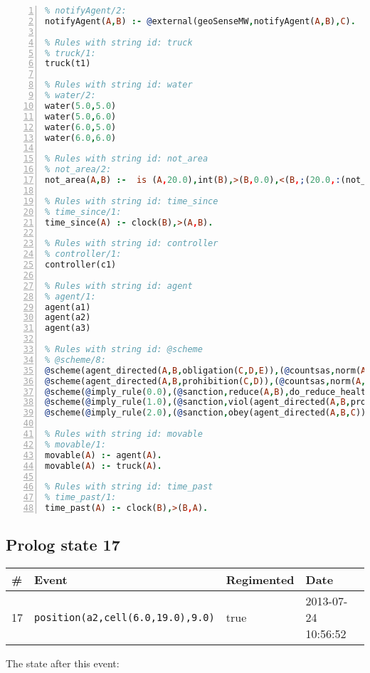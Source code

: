 \documentclass[11pt]{article}\usepackage[utf8]{inputenc}\usepackage{geometry}
\begin{document}
\begin{lstlisting}[language=Prolog, numbers=left]
% Rules with string id: notifyAgent
% notifyAgent/2:
notifyAgent(A,B) :- @external(geoSenseMW,notifyAgent(A,B),C).

% Rules with string id: truck
% truck/1:
truck(t1)

% Rules with string id: water
% water/2:
water(5.0,5.0)
water(5.0,6.0)
water(6.0,5.0)
water(6.0,6.0)

% Rules with string id: not_area
% not_area/2:
not_area(A,B) :-  is (A,20.0),int(B),>(B,0.0),<(B,;(20.0,:(not_area(A,B), is (-(B),20.0)))),int(A),>(A,0.0),<(A,;(20.0,:(area(A,B),-(int(A))))),int(B),>(A,0.0),>(B,0.0),<(A,21.0),<(B,21.0).

% Rules with string id: time_since
% time_since/1:
time_since(A) :- clock(B),>(A,B).

% Rules with string id: controller
% controller/1:
controller(c1)

% Rules with string id: agent
% agent/1:
agent(a1)
agent(a2)
agent(a3)

% Rules with string id: @scheme
% @scheme/8:
@scheme(agent_directed(A,B,obligation(C,D,E)),(@countsas,norm(A,B,F,obligation(C,D,E)),F),false,(listTrue(C)),(time_past(D)),false,[plus(viol(agent_directed(A,B,obligation(C,D,E))))|[]],[plus(obey(agent_directed(A,B,obligation(C,D,E))))|[]])
@scheme(agent_directed(A,B,prohibition(C,D)),(@countsas,norm(A,B,E,prohibition(C,D)),E),(listTrue(C)),false,(false),false,[plus(viol(agent_directed(A,B,prohibition(C,D))))|[]],[plus(obey(agent_directed(A,B,prohibition(C,D))))|[]])
@scheme(@imply_rule(0.0),(@sanction,reduce(A,B),do_reduce_health(A,B),notifyAgent(A,changed(status))),true,false,false,false,[min(reduce(A,B))|[]],[])
@scheme(@imply_rule(1.0),(@sanction,viol(agent_directed(A,B,prohibition(C,D))),do_sanction(D)),true,false,false,false,[min(viol(agent_directed(A,B,prohibition(C,D))))|[]],[])
@scheme(@imply_rule(2.0),(@sanction,obey(agent_directed(A,B,C))),true,false,false,false,[min(obey(agent_directed(A,B,C)))|[]],[])

% Rules with string id: movable
% movable/1:
movable(A) :- agent(A).
movable(A) :- truck(A).

% Rules with string id: time_past
% time_past/1:
time_past(A) :- clock(B),>(B,A).

\end{lstlisting}
\clearpage 
\subsection{Prolog state 17}
\begin{table}[ht]
\centering 
\begin{tabular}{l l l l} 
\textbf{\#} & \textbf{Event} & \textbf{Regimented} & \textbf{Date} \\ [0.5ex] 
\hline
17&\texttt{position(a2,cell(6.0,19.0),9.0)}&true&2013-07-24 10:56:52\\ [1ex] \hline\end{tabular}
\end{table}
The state after this event:
\end{document}
